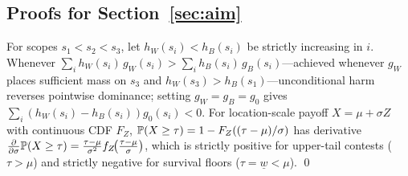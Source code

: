 \subsection{Proofs for Section~\ref{sec:aim}}

For scopes \(s_1 < s_2 < s_3\), let \(h_W(s_i) < h_B(s_i)\) be strictly increasing in \(i\). Whenever \(\sum_i h_W(s_i)\,g_W(s_i) > \sum_i h_B(s_i)\,g_B(s_i)\)---achieved whenever \(g_W\) places sufficient mass on \(s_3\) and \(h_W(s_3) > h_B(s_1)\)---unconditional harm reverses pointwise dominance; setting \(g_W = g_B = g_0\) gives \(\sum_i (h_W(s_i) - h_B(s_i))g_0(s_i) < 0\). For location-scale payoff \(X = \mu + \sigma Z\) with continuous CDF \(F_Z\), \(\mathbb{P}(X \ge \tau) = 1 - F_Z((\tau - \mu)/\sigma)\) has derivative \(\frac{\partial}{\partial \sigma}\mathbb{P}(X \ge \tau) = \frac{\tau - \mu}{\sigma^2}f_Z\!\bigl(\frac{\tau - \mu}{\sigma}\bigr)\), which is strictly positive for upper-tail contests (\(\tau > \mu\)) and strictly negative for survival floors (\(\tau = \underline{w} < \mu\)). \qed
